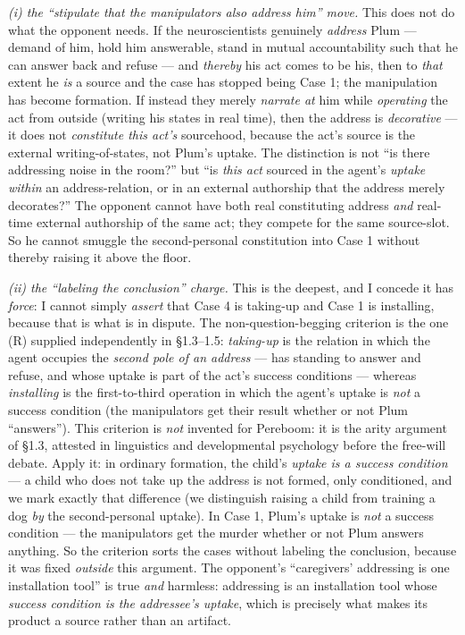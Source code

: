 \documentclass[11pt]{article}
\begin{document}
\emph{(i) the ``stipulate that the manipulators also address him'' move.} This does not do what the opponent needs. If the neuroscientists genuinely \emph{address} Plum — demand of him, hold him answerable, stand in mutual accountability such that he can answer back and refuse — and \emph{thereby} his act comes to be his, then to \emph{that} extent he \emph{is} a source and the case has stopped being Case 1; the manipulation has become formation. If instead they merely \emph{narrate at} him while \emph{operating} the act from outside (writing his states in real time), then the address is \emph{decorative} — it does not \emph{constitute this act's} sourcehood, because the act's source is the external writing-of-states, not Plum's uptake. The distinction is not ``is there addressing noise in the room?'' but ``is \emph{this act} sourced in the agent's \emph{uptake within} an address-relation, or in an external authorship that the address merely decorates?'' The opponent cannot have both real constituting address \emph{and} real-time external authorship of the same act; they compete for the same source-slot. So he cannot smuggle the second-personal constitution into Case 1 without thereby raising it above the floor.

\emph{(ii) the ``labeling the conclusion'' charge.} This is the deepest, and I concede it has \emph{force}: I cannot simply \emph{assert} that Case 4 is taking-up and Case 1 is installing, because that is what is in dispute. The non-question-begging criterion is the one (R) supplied independently in §1.3–1.5: \emph{taking-up} is the relation in which the agent occupies the \emph{second pole of an address} — has standing to answer and refuse, and whose uptake is part of the act's success conditions — whereas \emph{installing} is the first-to-third operation in which the agent's uptake is \emph{not} a success condition (the manipulators get their result whether or not Plum ``answers''). This criterion is \emph{not} invented for Pereboom: it is the arity argument of §1.3, attested in linguistics and developmental psychology before the free-will debate. Apply it: in ordinary formation, the child's \emph{uptake is a success condition} — a child who does not take up the address is not formed, only conditioned, and we mark exactly that difference (we distinguish raising a child from training a dog \emph{by} the second-personal uptake). In Case 1, Plum's uptake is \emph{not} a success condition — the manipulators get the murder whether or not Plum answers anything. So the criterion sorts the cases without labeling the conclusion, because it was fixed \emph{outside} this argument. The opponent's ``caregivers' addressing is one installation tool'' is true \emph{and} harmless: addressing is an installation tool whose \emph{success condition is the addressee's uptake}, which is precisely what makes its product a source rather than an artifact.
\end{document}
